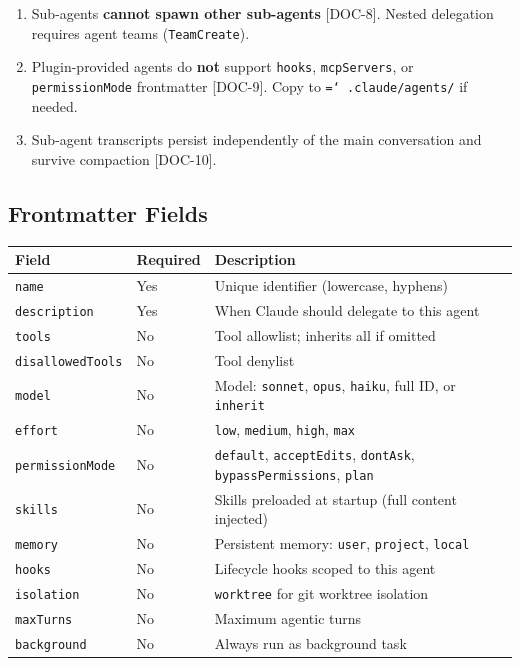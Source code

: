 \documentclass[a4paper,10pt]{article}
\newcommand{\fpath}[1]{\texttt{\hyphenchar\font=`\/ #1}}
\newcommand{\field}[1]{\texttt{#1}}
\newcommand{\coderef}[1]{\textsf{\small [#1]}}
\begin{document}
\begin{enumerate}
  \item Sub-agents \textbf{cannot spawn other sub-agents}
    \coderef{DOC-8}. Nested delegation requires agent teams
    (\field{TeamCreate}).
  \item Plugin-provided agents do \textbf{not} support
    \field{hooks}, \field{mcpServers}, or \field{permissionMode}
    frontmatter \coderef{DOC-9}. Copy to
    \fpath{.claude/agents/} if needed.
  \item Sub-agent transcripts persist independently of
    the main conversation and survive compaction
    \coderef{DOC-10}.
\end{enumerate}

\subsection{Frontmatter Fields}
\label{sec:frontmatter}

\begin{center}
\begin{tabularx}{\textwidth}{@{}llX@{}}
\toprule
\textbf{Field} & \textbf{Required} & \textbf{Description} \\
\midrule
\field{name} & Yes & Unique identifier (lowercase, hyphens) \\
\field{description} & Yes & When Claude should delegate to this
  agent \\
\field{tools} & No & Tool allowlist; inherits all if omitted \\
\field{disallowedTools} & No & Tool denylist \\
\field{model} & No & Model: \texttt{sonnet}, \texttt{opus},
  \texttt{haiku}, full ID, or \texttt{inherit} \\
\field{effort} & No & \texttt{low}, \texttt{medium},
  \texttt{high}, \texttt{max} \\
\field{permissionMode} & No & \texttt{default},
  \texttt{acceptEdits}, \texttt{dontAsk},
  \texttt{bypassPermissions}, \texttt{plan} \\
\field{skills} & No & Skills preloaded at startup (full content
  injected) \\
\field{memory} & No & Persistent memory: \texttt{user},
  \texttt{project}, \texttt{local} \\
\field{hooks} & No & Lifecycle hooks scoped to this agent \\
\field{isolation} & No & \texttt{worktree} for git worktree
  isolation \\
\field{maxTurns} & No & Maximum agentic turns \\
\field{background} & No & Always run as background task \\
\bottomrule
\end{tabularx}
\end{center}
\end{document}
